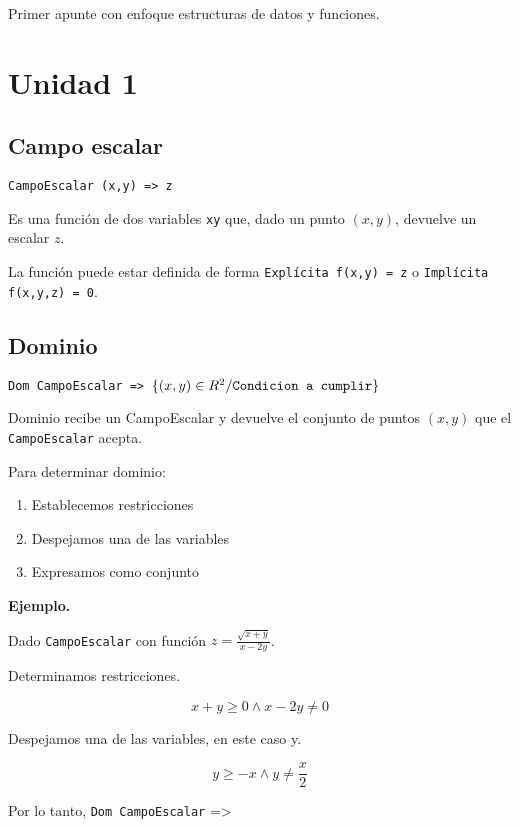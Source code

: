 Primer apunte con enfoque estructuras de datos y funciones.

\section{Unidad 1}

\subsection{Campo escalar}

\texttt{CampoEscalar (x,y) => z}

Es una función de dos variables \texttt{xy} que,
dado un punto \((x,y)\),
devuelve un escalar \(z\).

La función puede estar definida de forma
\texttt{Explícita f(x,y) = z} o \texttt{Implícita f(x,y,z) = 0}.

\subsection{Dominio}

\texttt{Dom CampoEscalar => \(\{(x,y) \in R^{2} / \text{\texttt{Condicion a cumplir}}\}\)}

Dominio recibe un CampoEscalar y devuelve el conjunto de puntos \((x,y)\)
que el \texttt{CampoEscalar} acepta.

Para determinar dominio:
\begin{enumerate}
    \item Establecemos restricciones
    \item Despejamos una de las variables
    \item Expresamos como conjunto
\end{enumerate}

\textbf{Ejemplo.}

Dado \texttt{CampoEscalar} con función
\(z = \frac{\sqrt{x+y}}{x-2y}\).

Determinamos restricciones.

\begin{equation*}
    x+y \geq 0 \land x-2y \neq 0
\end{equation*}

Despejamos una de las variables, en este caso y.

\begin{equation*}
    y \geq -x \land y \neq \frac{x}{2}
\end{equation*}

Por lo tanto, \texttt{Dom CampoEscalar} =>

